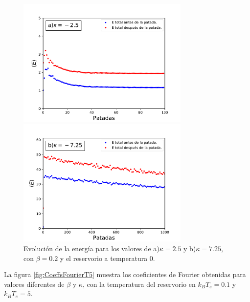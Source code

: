 \documentclass[letterpaper,12pt,oneside]{book}
\begin{document}
\begin{figure}[h!]
	\centering
	\begin{minipage}{0.45\textwidth}
		\includegraphics[width=8.5cm]{Figs/EnergiaK25}
	\end{minipage}
	\begin{minipage}{0.45\textwidth}
		\includegraphics[width=8.5cm]{Figs/EnergiaK725}
	\end{minipage}
	\caption{Evolución de la energía para los valores de a)$\kappa=2.5$ y  b)$\kappa=7.25$, con $\beta=0.2$ y el reservorio a temperatura 0.}
	\label{fig:EnergiaAtractores}
\end{figure}


La figura \ref{fig:CoeffsFourierT5} muestra los coeficientes de Fourier obtenidas para valores diferentes de $\beta$ y $\kappa$, con la temperatura del reservorio en $k_BT_e = 0.1$ y $k_BT_e = 5$.
\end{document}
